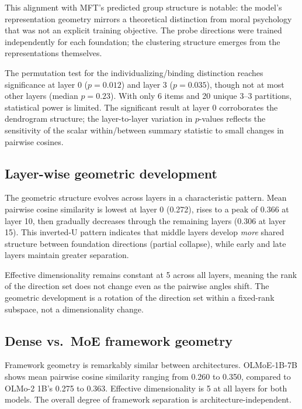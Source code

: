 This alignment with MFT's predicted group structure is notable:
the model's representation geometry mirrors a theoretical
distinction from moral psychology that was not an explicit training
objective. The probe directions were trained independently for each
foundation; the clustering structure emerges from the representations
themselves.

The permutation test for the individualizing/binding distinction
reaches significance at layer 0 (\(p = 0.012\)) and layer 3
(\(p = 0.035\)), though not at most other layers (median \(p = 0.23\)).
With only 6 items and 20 unique 3--3 partitions, statistical power
is limited. The significant result at layer 0 corroborates the
dendrogram structure; the layer-to-layer variation in \(p\)-values
reflects the sensitivity of the scalar within/between summary
statistic to small changes in pairwise cosines.

\subsection{Layer-wise geometric development}\label{layer-wise-geometric-development}

The geometric structure evolves across layers in a characteristic
pattern. Mean pairwise cosine similarity is lowest at layer 0
(0.272), rises to a peak of 0.366 at layer 10, then gradually
decreases through the remaining layers (0.306 at layer 15). This
inverted-U pattern indicates that middle layers develop \emph{more}
shared structure between foundation directions (partial collapse),
while early and late layers maintain greater separation.

Effective dimensionality remains constant at 5 across all layers,
meaning the rank of the direction set does not change even as the
pairwise angles shift. The geometric development is a rotation of
the direction set within a fixed-rank subspace, not a
dimensionality change.

\subsection{Dense vs.~MoE framework geometry}\label{dense-vs.-moe-framework-geometry}

Framework geometry is remarkably similar between architectures.
OLMoE-1B-7B shows mean pairwise cosine similarity ranging from
0.260 to 0.350, compared to OLMo-2 1B's 0.275 to 0.363. Effective
dimensionality is 5 at all layers for both models. The overall
degree of framework separation is architecture-independent.

